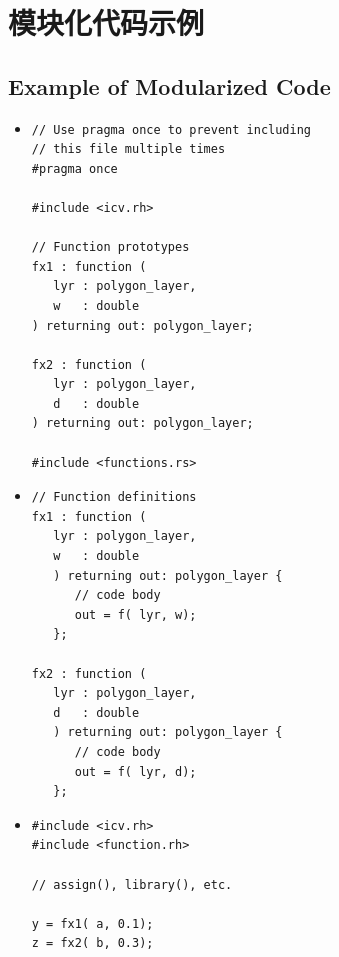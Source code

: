 \section{模块化代码示例}
\subsection*{Example of Modularized Code}

\begin{itemize}
  \item {}
\begin{lstlisting}[style=pxl]
// Use pragma once to prevent including
// this file multiple times
#pragma once

#include <icv.rh>

// Function prototypes
fx1 : function (
   lyr : polygon_layer,
   w   : double
) returning out: polygon_layer;

fx2 : function (
   lyr : polygon_layer,
   d   : double
) returning out: polygon_layer;

#include <functions.rs>
\end{lstlisting}

  \item {}
\begin{lstlisting}[style=pxl]
// Function definitions
fx1 : function (
   lyr : polygon_layer,
   w   : double
   ) returning out: polygon_layer {
      // code body
      out = f( lyr, w);
   };

fx2 : function (
   lyr : polygon_layer,
   d   : double
   ) returning out: polygon_layer {
      // code body
      out = f( lyr, d);
   };
\end{lstlisting}

  \item {}
\begin{lstlisting}[style=pxl]
#include <icv.rh>
#include <function.rh>

// assign(), library(), etc.

y = fx1( a, 0.1);
z = fx2( b, 0.3);
\end{lstlisting}
\end{itemize}
